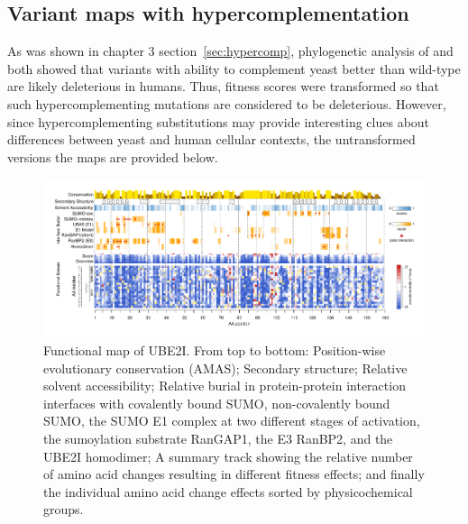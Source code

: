 \begin{appendices}
\chapter{Variant maps with hypercomplementation}
\label{apdx:maps}
As was shown in chapter 3 section~\ref{sec:hypercomp}, phylogenetic analysis of  and  both showed that variants with ability to complement yeast better than wild-type are likely deleterious in humans. Thus, fitness scores were transformed so that such hypercomplementing mutations are considered to be deleterious. However, since hypercomplementing substitutions may provide interesting clues about differences between yeast and human cellular contexts, the untransformed versions the maps are provided below.

\begin{landscape}
\begin{figure}[h]
	\centering
	\includegraphics[width=9in]{img/ube2i_map.pdf}
	\caption{Functional map of UBE2I. From top to bottom: Position-wise evolutionary conservation (AMAS); Secondary structure; Relative solvent accessibility; Relative burial in protein-protein interaction interfaces with covalently bound SUMO, non-covalently bound SUMO, the SUMO E1 complex at two different stages of activation, the sumoylation substrate RanGAP1, the E3 RanBP2, and the UBE2I homodimer; A summary track showing the relative number of amino acid changes resulting in different fitness effects; and finally the individual amino acid change effects sorted by physicochemical groups.}
\end{figure}
\end{landscape}



\end{appendices}
